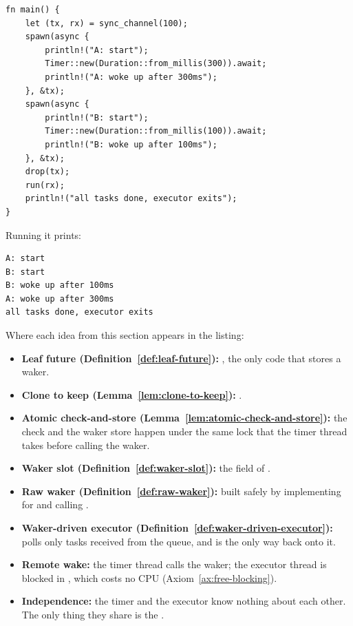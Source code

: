\begin{lstlisting}[caption={A complete executor and timer.}, label=lst:wakers-17.1]
fn main() {
    let (tx, rx) = sync_channel(100);
    spawn(async {
        println!("A: start");
        Timer::new(Duration::from_millis(300)).await;
        println!("A: woke up after 300ms");
    }, &tx);
    spawn(async {
        println!("B: start");
        Timer::new(Duration::from_millis(100)).await;
        println!("B: woke up after 100ms");
    }, &tx);
    drop(tx);
    run(rx);
    println!("all tasks done, executor exits");
}
\end{lstlisting}

Running it prints:

\begin{lstlisting}[language={}, numbers=none]
A: start
B: start
B: woke up after 100ms
A: woke up after 300ms
all tasks done, executor exits
\end{lstlisting}

Where each idea from this section appears in the listing:

\begin{itemize}
    \item \textbf{Leaf future (Definition~\ref{def:leaf-future}):} , the only code that stores a waker.
    \item \textbf{Clone to keep (Lemma~\ref{lem:clone-to-keep}):} .
    \item \textbf{Atomic check-and-store (Lemma~\ref{lem:atomic-check-and-store}):} the  check and the waker store happen under the same lock that the timer thread takes before calling the waker.
    \item \textbf{Waker slot (Definition~\ref{def:waker-slot}):} the  field of .
    \item \textbf{Raw waker (Definition~\ref{def:raw-waker}):} built safely by implementing  for  and calling .
    \item \textbf{Waker-driven executor (Definition~\ref{def:waker-driven-executor}):}  polls only tasks received from the queue, and  is the only way back onto it.
    \item \textbf{Remote wake:} the timer thread calls the waker; the executor thread is blocked in , which costs no CPU (Axiom~\ref{ax:free-blocking}).
    \item \textbf{Independence:} the timer and the executor know nothing about each other. The only thing they share is the .
\end{itemize}

